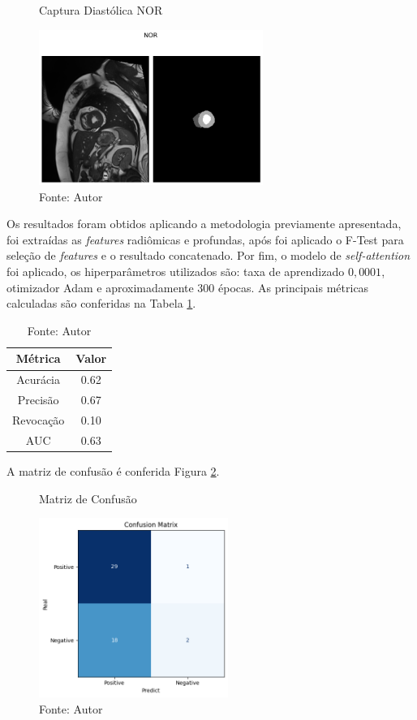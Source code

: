 \begin{figure}[htbp]
    \caption{Captura Diastólica NOR}
    \centering
    \includegraphics[width=0.65\textwidth]{figures/fig020.png}
    \caption{Fonte: Autor}
    \label{fig:fig020}
\end{figure}

Os resultados foram obtidos aplicando a metodologia previamente apresentada, foi extraídas as \textit{features} radiômicas e profundas, após foi aplicado o F-Test para seleção de \textit{features} e o resultado concatenado. Por fim, o modelo de \textit{self-attention} foi aplicado, os hiperparâmetros utilizados são: taxa de aprendizado $0,0001$, otimizador \gls{Adam} e aproximadamente 300 épocas. As principais métricas calculadas são conferidas na Tabela \ref{tab:metrics}.

\begin{table}[hbtp]
    \centering
    \renewcommand{\arraystretch}{1} %
    \begin{tabular}{|c|c|}
    \hline 
          \textbf{Métrica} & \textbf{Valor} \\ 
    \hline 
        Acurácia & 0.62 \\ 
    \hline 
        Precisão & 0.67 \\ 
    \hline 
        Revocação & 0.10 \\ 
    \hline 
        AUC & 0.63 \\ 
    \hline 
    \end{tabular} 
    \caption{Fonte: Autor}
    \label{tab:metrics}
\end{table}

A matriz de confusão é conferida Figura \ref{fig:fig016}.

\begin{figure}[htbp]
    \caption{Matriz de Confusão}
    \centering
    \includegraphics[width=0.55\textwidth]{figures/fig016.png}
    \caption{Fonte: Autor}
    \label{fig:fig016}
\end{figure}

